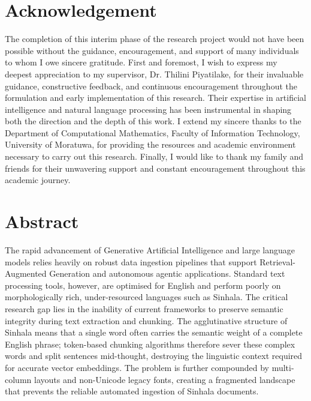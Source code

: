 \documentclass[12pt,a4paper,oneside]{report}
\begin{document}
\chapter*{Acknowledgement}
The completion of this interim phase of the research project would not have been possible without the guidance, encouragement, and support of many individuals to whom I owe sincere gratitude. First and foremost, I wish to express my deepest appreciation to my supervisor, Dr. Thilini Piyatilake, for their invaluable guidance, constructive feedback, and continuous encouragement throughout the formulation and early implementation of this research. Their expertise in artificial intelligence and natural language processing has been instrumental in shaping both the direction and the depth of this work. I extend my sincere thanks to the Department of Computational Mathematics, Faculty of Information Technology, University of Moratuwa, for providing the resources and academic environment necessary to carry out this research. Finally, I would like to thank my family and friends for their unwavering support and constant encouragement throughout this academic journey.

\clearpage

\chapter*{Abstract}

The rapid advancement of Generative Artificial Intelligence and large language models relies heavily on robust data ingestion pipelines that support Retrieval-Augmented Generation and autonomous agentic applications. Standard text processing tools, however, are optimised for English and perform poorly on morphologically rich, under-resourced languages such as Sinhala. The critical research gap lies in the inability of current frameworks to preserve semantic integrity during text extraction and chunking. The agglutinative structure of Sinhala means that a single word often carries the semantic weight of a complete English phrase; token-based chunking algorithms therefore sever these complex words and split sentences mid-thought, destroying the linguistic context required for accurate vector embeddings. The problem is further compounded by multi-column layouts and non-Unicode legacy fonts, creating a fragmented landscape that prevents the reliable automated ingestion of Sinhala documents.
\end{document}
